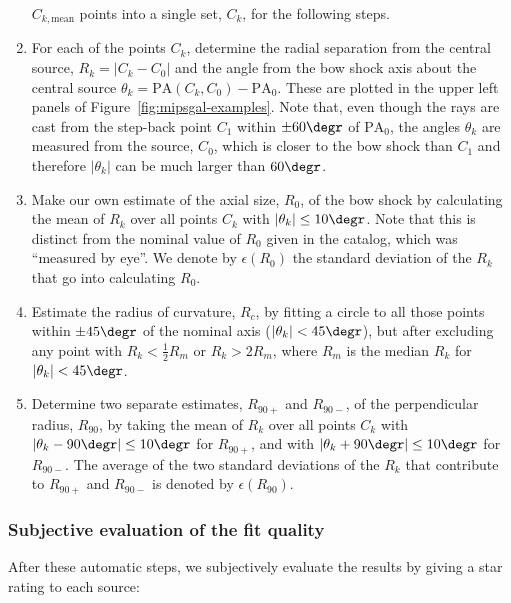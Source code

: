 \begin{enumerate}[1.]
  \(C_{k,\text{mean}}\) points into a single set, \(C_{k}\), for
  the following steps.
\item For each of the points \(C_{k}\), determine the radial
  separation from the central source, \(R_k = |C_k - C_0|\) and the
  angle from the bow shock axis about the central source
  \(\theta_k = \text{PA}(C_k, C_0) - \text{PA}_0\).  These are plotted in
  the upper left panels of Figure~\ref{fig:mipsgal-examples}.  Note
  that, even though the rays are cast from the step-back point \(C_1\)
  within \(\pm 60\degr\) of \(\text{PA}_0\), the angles \(\theta_k\) are
  measured from the source, \(C_0\), which is closer to the bow shock
  than \(C_1\) and therefore \(|\theta_k|\) can be much larger than
  \(60\degr\).
\item Make our own estimate of the axial size, \(R_0\), of the bow
  shock by calculating the mean of \(R_k\) over all points \(C_k\)
  with \(|\theta_k| \le 10\degr\).  Note that this is distinct from the
  nominal value of \(R_0\) given in the \citet{Kobulnicky:2016a}
  catalog, which was ``measured by eye''.  We denote by
  \(\epsilon(R_0)\) the standard deviation of the \(R_k\) that go into
  calculating \(R_0\).\label{step:R0}
\item Estimate the radius of curvature, \(R_c\), by fitting a circle
  to all those points within \(\pm 45\degr\) of the nominal axis
  (\(|\theta_k| < 45\degr\)), but after excluding any point with
  \(R_k < \frac12 R_m\) or \(R_k > 2 R_m\), where \(R_m\) is the median
  \(R_k\) for \(|\theta_k| < 45\degr\).
\item Determine two separate estimates, \(R_{90+}\) and \(R_{90-}\),
  of the perpendicular radius, \(R_{90}\), by taking the mean of
  \(R_k\) over all points \(C_k\) with
  \(|\theta_k - 90\degr| \le 10\degr\) for \(R_{90+}\), and with
  \(|\theta_k + 90\degr| \le 10\degr\) for \(R_{90-}\).  The average of the
  two standard deviations of the \(R_k\) that contribute to
  \(R_{90+}\) and \(R_{90-}\) is denoted by \(\epsilon(R_{90})\).\label{step:R90}
\end{enumerate}


\subsubsection{Subjective evaluation of the fit quality}
\label{sec:subj-eval-fit}


After these automatic steps, we subjectively evaluate the results by giving a star rating to each source:

